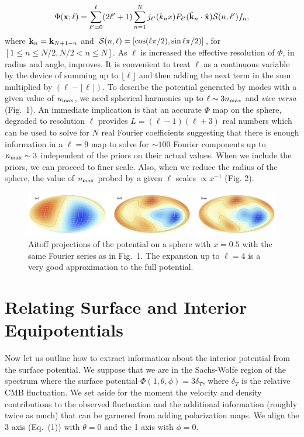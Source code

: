 \documentclass[useAMS,usenatbib,a4paper]{mn2e}
\begin{document}
\begin{equation}
\Phi({\bf x;\ell})=\sum_{\ell'=0} ^\ell(2\ell'+1)\sum_{n=1}^Nj_{\ell'}(k_nx)P_{\ell'}({\hat{\bf k}}_n\cdot{\hat{\bf x}}){\cal S}(n,\ell')f_n,
\end{equation}
where ${\bf k}_n={\bf k}_{N+1-n}$ and ${\cal S}(n,\ell)=[\cos(\ell\pi/2),\sin\ell\pi/2)]$, for $[1\le n\le N/2,N/2<n\le N]$. As $\ell$ is increased the effective resolution of $\Phi$, in radius and angle, improves. It is convenient to treat $\ell$ as a continuous variable by the device of summing up to $\lfloor\ell\rfloor$  and then adding the next term in the sum multiplied by $(\ell-\lfloor\ell\rfloor)$. To describe the potential generated by modes with a given value of $n_{\rm max}$, we need spherical harmonics up to $\ell\sim3n_{\rm max}$ and {\it vice versa} (Fig.~1). An immediate implication is that an accurate $\Phi$ map on the sphere, degraded to resolution $\ell$ provides $L=(\ell-1)(\ell+3)$ real numbers which can be used to solve for $N$ real Fourier coefficients suggesting that there is enough information in a $\ell=9$ map to solve for $\sim100$ Fourier components up to $n_{\rm max}\sim3$ independent of the priors on their actual values. When we include the priors, we can proceed to finer scale. Also, when we reduce the radius of the sphere, the value of $n_{\rm max}$  probed by a given $\ell$ scales $\propto x^{-1}$ (Fig. 2).

\begin{figure}
\centering
\includegraphics[width=0.9\linewidth]{fig2.jpg}
\caption{Aitoff projections of the potential on a sphere with $x=0.5$ with the same Fourier series as in Fig.~1. The expansion up to $\ell=4$ is a very good approximation to the full potential.}
\end{figure}



\section{Relating Surface and Interior Equipotentials}

Now let us outline how to extract information about the interior
potential from the surface potential. We suppose that we are in the
Sachs-Wolfe region of the spectrum where the surface potential
$\Phi(1,\theta,\phi)=3\delta_T$, where $\delta_T$ is the relative CMB
fluctuation. We set aside for the moment the velocity and density
contributions to the observed fluctuation and the additional
information (roughly twice as much) that can be garnered from adding
polarization maps. We align the 3 axis (Eq.~(1)) with $\theta=0$ and
the 1 axis with $\phi=0$.
\end{document}
